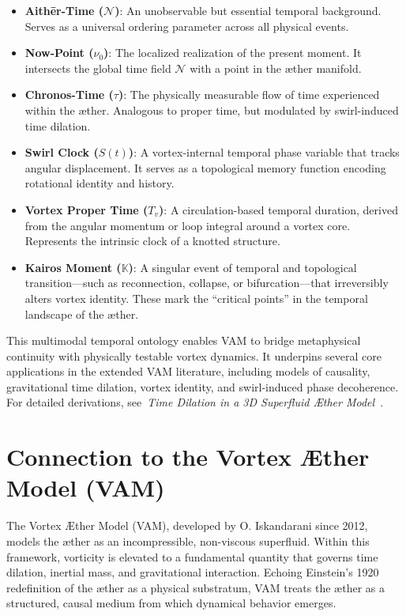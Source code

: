 \documentclass[preprint]{revtex4-2}
\begin{document}
\begin{itemize}
    \item \textbf{Aithēr-Time (\( \mathcal{N} \))}: An unobservable but essential temporal background. Serves as a universal ordering parameter across all physical events.

    \item \textbf{Now-Point (\( \nu_0 \))}: The localized realization of the present moment. It intersects the global time field \( \mathcal{N} \) with a point in the æther manifold.

    \item \textbf{Chronos-Time (\( \tau \))}: The physically measurable flow of time experienced within the æther. Analogous to proper time, but modulated by swirl-induced time dilation.

    \item \textbf{Swirl Clock (\( S(t) \))}: A vortex-internal temporal phase variable that tracks angular displacement. It serves as a topological memory function encoding rotational identity and history.

    \item \textbf{Vortex Proper Time (\( T_v \))}: A circulation-based temporal duration, derived from the angular momentum or loop integral around a vortex core. Represents the intrinsic clock of a knotted structure.

    \item \textbf{Kairos Moment (\( \mathbb{K} \))}: A singular event of temporal and topological transition—such as reconnection, collapse, or bifurcation—that irreversibly alters vortex identity. These mark the “critical points” in the temporal landscape of the æther.
\end{itemize}

This multimodal temporal ontology enables VAM to bridge metaphysical continuity with physically testable vortex dynamics. It underpins several core applications in the extended VAM literature, including models of causality, gravitational time dilation, vortex identity, and swirl-induced phase decoherence. For detailed derivations, see~\textit{Time Dilation in a 3D Superfluid Æther Model}~\cite{iskandarani2025vam2}.


\section{Connection to the Vortex Æther Model (VAM)}

The Vortex Æther Model (VAM), developed by O. Iskandarani since 2012, models the æther as an incompressible, non-viscous superfluid. Within this framework, vorticity is elevated to a fundamental quantity that governs time dilation, inertial mass, and gravitational interaction. Echoing Einstein’s 1920 redefinition of the æther as a physical substratum, VAM treats the æther as a structured, causal medium from which dynamical behavior emerges.
\end{document}
